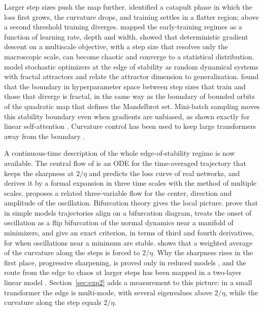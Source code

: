 Larger step sizes push the map further. \citet{lewkowycz2020large} identified a catapult phase in which the loss first grows, the curvature drops, and training settles in a flatter region; above a second threshold training diverges. \citet{kalra2023phase} mapped the early-training regimes as a function of learning rate, depth and width. \citet{kong2020stochasticity} showed that deterministic gradient descent on a multiscale objective, with a step size that resolves only the macroscopic scale, can become chaotic and converge to a statistical distribution. \citet{tuci2026generalization} model stochastic optimizers at the edge of stability as random dynamical systems with fractal attractors and relate the attractor dimension to generalization. \citet{sohldickstein2024boundary} found that the boundary in hyperparameter space between step sizes that train and those that diverge is fractal, in the same way as the boundary of bounded orbits of the quadratic map that defines the Mandelbrot set. Mini-batch sampling moves this stability boundary even when gradients are unbiased, as shown exactly for linear self-attention \citep{balasubramanian2026unbiased}. Curvature control has been used to keep large transformers away from the boundary \citep{ramasinghe2026taming,gilmer2021loss}.

A continuous-time description of the whole edge-of-stability regime is now available. The central flow of \citet{cohen2024central} is an ODE for the time-averaged trajectory that keeps the sharpness at $2/\eta$ and predicts the loss curve of real networks, and \citet{berthier2026multiple} derives it by a formal expansion in three time scales with the method of multiple scales. \citet{marion2026edge} proposes a related three-variable flow for the center, direction and amplitude of the oscillation. Bifurcation theory gives the local picture. \citet{song2023trajectory} prove that in simple models trajectories align on a bifurcation diagram, \citet{gan2026bifurcation} treats the onset of oscillation as a flip bifurcation of the normal dynamics near a manifold of minimizers, and \citet{mulayoff2026stability} give an exact criterion, in terms of third and fourth derivatives, for when oscillations near a minimum are stable. \citet{litman2026origin} shows that a weighted average of the curvature along the steps is forced to $2/\eta$. Why the sharpness rises in the first place, progressive sharpening, is proved only in reduced models \citep{agarwala2022secondorder}, and the route from the edge to chaos at larger steps has been mapped in a two-layer linear model \citep{kalra2023universal}. Section~\ref{sec:exp2} adds a measurement to this picture: in a small transformer the edge is multi-mode, with several eigenvalues above $2/\eta$, while the curvature along the step equals $2/\eta$.

